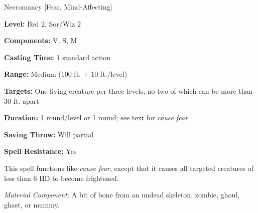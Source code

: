 
Necromancy [Fear, Mind-Affecting]

\textbf{Level:} Brd 2, Sor/Wiz 2

\textbf{Components:} V, S, M

\textbf{Casting Time:} 1 standard action

\textbf{Range:} Medium (100 ft. + 10 ft./level)

\textbf{Targets:} One living creature per three levels, no two of which can be 
more than 30 ft. apart

\textbf{Duration:} 1 round/level or 1 round; see text for \textit{cause fear}

\textbf{Saving Throw:} Will partial

\textbf{Spell Resistance:} Yes

This spell functions like \textit{cause fear}, except that it causes all targeted 
creatures of less than 6 HD to become frightened.

\textit{Material Component:} A bit of bone from an undead skeleton, zombie, ghoul, 
ghast, or mummy.

